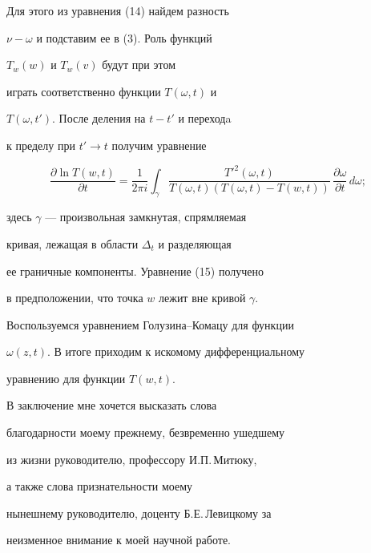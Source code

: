 \begin{pf}
Для этого из уравнения (14) найдем разность


$\nu-\omega$ и подставим ее в (3). Роль функций


$T_{w}(w)$ и $T_{w}(v)$ будут при этом


играть соответственно функции $T(\omega,t)$ и 


$T(\omega,t')$. После деления на $t-t'$ и переходa


к пределу при $t'\to t$ получим уравнение


\begin{equation}


\frac{\partial\ln T(w,t)}{\partial t}=


\frac{1}{2\pi i}


\int_{\gamma}\frac{{T'}^{2}(\omega,t)}{T(\omega,t)(T(\omega,t)-T(w,t))}


\,\frac{\partial \omega}{\partial t}\,d\omega;


\end{equation}


здесь $\gamma$ --- произвольная замкнутая, спрямляемая


кривая, лежащая в области $\Delta_{t}$ и разделяющая


ее граничные компоненты. Уравнение (15) получено


в предположении, что точка $w$ лежит вне кривой $\gamma$.





Воспользуемся уравнением Голузина--Комацу для функции


$\omega(z,t)$. В итоге приходим к искомому дифференциальному


уравнению для функции $T(w,t)$.


\end{pf}





В заключение мне хочется высказать слова 


благодарности моему прежнему, безвременно ушедшему 


из жизни руководителю, профессору И.П.\,Митюку,


а также слова признательности моему  


нынешнему руководителю, доценту Б.Е.\,Левицкому за 


неизменное внимание к моей научной работе.





